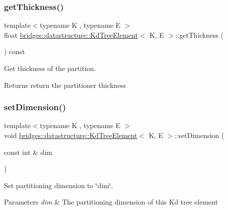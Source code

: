 \subsubsection{\texorpdfstring{get\+Thickness()}{getThickness()}}
{\footnotesize\ttfamily template$<$typename K , typename E $>$ \\
float \hyperlink{classbridges_1_1datastructure_1_1_kd_tree_element}{bridges\+::datastructure\+::\+Kd\+Tree\+Element}$<$ K, E $>$\+::get\+Thickness (\begin{DoxyParamCaption}{ }\end{DoxyParamCaption}) const\hspace{0.3cm}{\ttfamily [inline]}}



Get thickness of the partition. 

\begin{DoxyReturn}{Returns}
return the partitioner thickness 
\end{DoxyReturn}
\mbox{\label{classbridges_1_1datastructure_1_1_kd_tree_element_a9862bde7b85254224963e23dd9bcee29}} 
\subsubsection{\texorpdfstring{set\+Dimension()}{setDimension()}}
{\footnotesize\ttfamily template$<$typename K , typename E $>$ \\
void \hyperlink{classbridges_1_1datastructure_1_1_kd_tree_element}{bridges\+::datastructure\+::\+Kd\+Tree\+Element}$<$ K, E $>$\+::set\+Dimension (\begin{DoxyParamCaption}\item[{const int \&}]{dim }\end{DoxyParamCaption})\hspace{0.3cm}{\ttfamily [inline]}}



Set partitioning dimension to \char`\"{}dim\char`\"{}. 


\begin{DoxyParams}{Parameters}
{\em dim} & The partitioning dimension of this Kd tree element \\
\hline
\end{DoxyParams}
\mbox{\label{classbridges_1_1datastructure_1_1_kd_tree_element_a2ca1571186e00b69f73f324bc4c20753}} 
